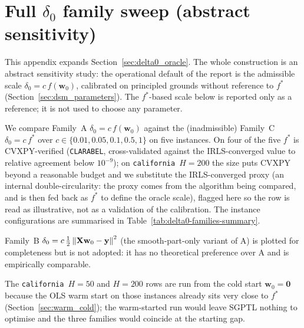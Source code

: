 \chapter{Full \texorpdfstring{$\delta_{0}$}{delta\_0} family sweep (abstract sensitivity)}
\label{app:delta0-families}

This appendix expands Section~\ref{sec:delta0_oracle}. The whole
construction is an abstract sensitivity study: the operational default
of the report is the admissible scale $\delta_{0}=c\,f(\mathbf{w}_{0})$,
calibrated on principled grounds without reference to $f^{*}$
(Section~\ref{sec:dsm_parameters}). The $f^{*}$-based scale below is
reported only as a reference; it is not used to choose any parameter.

We compare Family~A $\delta_{0}=c\,f(\mathbf{w}_{0})$ against the
(inadmissible) Family~C $\delta_{0}=c\,f^{*}$ over
$c\in\{0.01,0.05,0.1,0.5,1\}$ on five instances. On four of the five
$f^{*}$ is CVXPY-verified (\texttt{CLARABEL}, cross-validated against the
IRLS-converged value to relative agreement below $10^{-9}$); on
\texttt{california}~$H=200$ the size puts CVXPY beyond a reasonable
budget and we substitute the IRLS-converged proxy (an internal
double-circularity: the proxy comes from the algorithm being compared,
and is then fed back as $f^{*}$ to define the oracle scale), flagged
here so the row is read as illustrative, not as a validation of the
calibration. The instance configurations are summarised in
Table~\ref{tab:delta0-families-summary}.

Family~B $\delta_{0}=c\,\tfrac12\left\lVert \mathbf{X}\mathbf{w}_{0}-\mathbf{y} \right\rVert^{2}$
(the smooth-part-only variant of A) is plotted for completeness but is
not adopted: it has no theoretical preference over A and is empirically
comparable.

The \texttt{california}~$H=50$ and $H=200$ rows are run from the cold
start $\mathbf{w}_{0}=\mathbf{0}$ because the OLS warm start on those
instances already sits very close to $f^{*}$
(Section~\ref{sec:warm_cold}); the warm-started run would leave SGPTL
nothing to optimise and the three families would coincide at the
starting gap.

